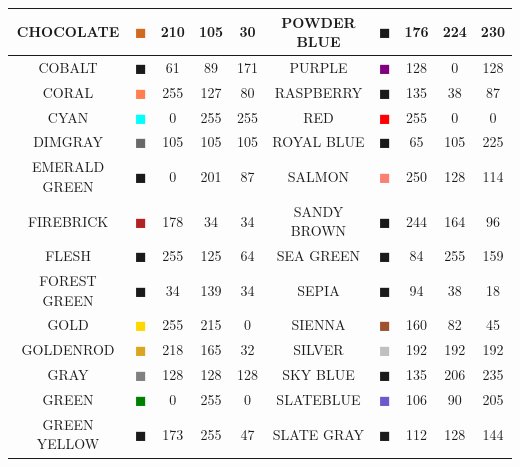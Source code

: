 \documentclass[11pt]{book}
\begin{document}
\begin{table}[H]
\begin{center}
\begin{tabular}{|c|c|c|c|c|c||c|c|c|c|}
{\ct CHOCOLATE} & \textcolor{CHOCOLATE} {$\blacksquare$} & 210& 105& 30& {\ct POWDER BLUE} &  \textcolor{POWDER BLUE} {$\blacksquare$} & 176& 224& 230  \\ \hline
{\ct COBALT} & \textcolor{COBALT} {$\blacksquare$} & 61& 89& 171& {\ct PURPLE} &  \textcolor{PURPLE} {$\blacksquare$} & 128& 0& 128  \\ \hline
{\ct CORAL} & \textcolor{CORAL} {$\blacksquare$} & 255& 127& 80& {\ct RASPBERRY} &  \textcolor{RASPBERRY} {$\blacksquare$} & 135& 38& 87  \\ \hline
{\ct CYAN} & \textcolor{CYAN} {$\blacksquare$} & 0& 255& 255& {\ct RED} &  \textcolor{RED} {$\blacksquare$} & 255& 0& 0  \\ \hline
{\ct DIMGRAY } & \textcolor{DIMGRAY } {$\blacksquare$} & 105& 105& 105& {\ct ROYAL BLUE} &  \textcolor{ROYAL BLUE} {$\blacksquare$} & 65& 105& 225  \\ \hline
{\ct EMERALD GREEN} & \textcolor{EMERALD GREEN} {$\blacksquare$} & 0& 201& 87& {\ct SALMON} &  \textcolor{SALMON} {$\blacksquare$} & 250& 128& 114  \\ \hline
{\ct FIREBRICK} & \textcolor{FIREBRICK} {$\blacksquare$} & 178& 34& 34& {\ct SANDY BROWN} &  \textcolor{SANDY BROWN} {$\blacksquare$} & 244& 164& 96  \\ \hline
{\ct FLESH} & \textcolor{FLESH} {$\blacksquare$} & 255& 125& 64& {\ct SEA GREEN} &  \textcolor{SEA GREEN} {$\blacksquare$} & 84& 255& 159  \\ \hline
{\ct FOREST GREEN} & \textcolor{FOREST GREEN} {$\blacksquare$} & 34& 139& 34& {\ct SEPIA} &  \textcolor{SEPIA} {$\blacksquare$} & 94& 38& 18  \\ \hline
{\ct GOLD } & \textcolor{GOLD } {$\blacksquare$} & 255& 215& 0& {\ct SIENNA} &  \textcolor{SIENNA} {$\blacksquare$} & 160& 82& 45  \\ \hline
{\ct GOLDENROD} & \textcolor{GOLDENROD} {$\blacksquare$} & 218& 165& 32& {\ct SILVER} &  \textcolor{SILVER} {$\blacksquare$} & 192& 192& 192  \\ \hline
{\ct GRAY} & \textcolor{GRAY} {$\blacksquare$} & 128& 128& 128& {\ct SKY BLUE} &  \textcolor{SKY BLUE} {$\blacksquare$} & 135& 206& 235  \\ \hline
{\ct GREEN} & \textcolor{GREEN} {$\blacksquare$} & 0& 255& 0& {\ct SLATEBLUE} &  \textcolor{SLATEBLUE} {$\blacksquare$} & 106& 90& 205  \\ \hline
{\ct GREEN YELLOW} & \textcolor{GREEN YELLOW} {$\blacksquare$} & 173& 255& 47& {\ct SLATE GRAY} &  \textcolor{SLATE GRAY} {$\blacksquare$} & 112& 128& 144  \\ \hline

\end{tabular}
\end{center}
\end{table}
\end{document}
